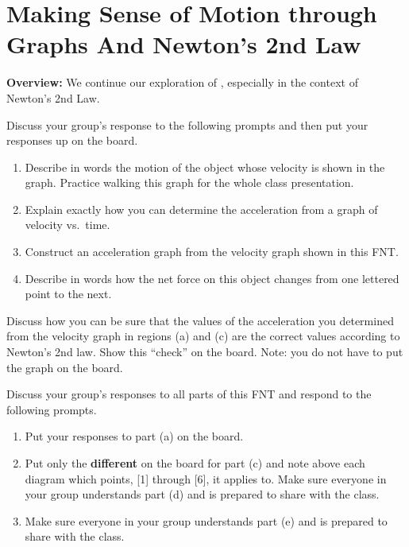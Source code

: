 \section[\motiongraphs{} and Newton's 2nd Law]{Making Sense of Motion through Graphs And Newton's 2nd Law}
\label{act8.2.3}

\begin{overview}

\textbf{Overview:} We continue our exploration of \motiongraphs{}, especially in the context of Newton's 2nd Law.

\end{overview}

\begin{fnt}
	
\end{fnt}

Discuss your group's response to the following prompts and then put your responses up on the board.
\begin{enumerate}
	\item Describe in words the motion of the object whose velocity is shown in the graph. Practice walking this graph for the whole class presentation.
	\item Explain exactly how you can determine the acceleration from a graph of velocity vs.\ time.
	\item Construct an acceleration graph from the velocity graph shown in this FNT.
	\item Describe in words how the net force on this object changes from one lettered point to the next.
\end{enumerate}

\WCD

\begin{fnt}
	
\end{fnt}

Discuss how you can be sure that the values of the acceleration you determined from the velocity graph in regions (a) and (c) are the correct values according to Newton's 2nd law. Show this ``check'' on the board. Note: you do not have to put the graph on the board.

\WCD

\begin{fnt}
	
\end{fnt}

Discuss your group's responses to all parts of this FNT and respond to the following prompts.
\begin{enumerate}
	\item Put your responses to part (a) on the board.
	\item Put only the \textbf{different} \forcediags{} on the board for part (c) and note above each diagram which points, [1] through [6], it applies to. Make sure everyone in your group understands part (d) and is prepared to share with the class.
	\item Make sure everyone in your group understands part (e) and is prepared to share with the class.
\end{enumerate}

